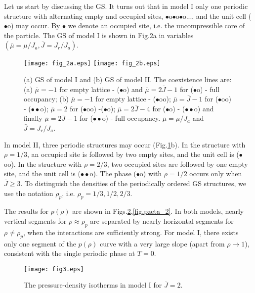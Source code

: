 \documentclass[preprint,
prl,%
aps]{revtex4}
\begin{document}
 Let us start by discussing the GS. 
It turns out that in model I only one periodic structure with  alternating empty and occupied sites,
$\bullet$o$\bullet$o$\bullet$o..., and the unit cell ($\bullet$o)
may occur. By $\bullet$ we denote an occupied site, i.e. the uncompressible core of the particle.
The GS of model I is shown in Fig.2a
in variables $(\bar\mu=\mu/J_a,\bar J=J_r/J_a)$. 
\begin{figure}[h]
\centering
\texttt{[image: fig\_2a.eps]}
\texttt{[image: fig\_2b.eps]}
\caption{ (a)  GS of  model I 
and (b) GS of model II. The coexistence lines are: (a) $\bar \mu=-1$ for
empty lattice - ($\bullet$o) and $\bar\mu=2\bar J -1$ for ($\bullet$o) - full occupancy;
 (b) $\bar\mu=-1$ for
empty  lattice  - ($\bullet$oo); $\bar\mu=\bar J-1$ for ($\bullet$oo) - ($\bullet\bullet$o); $\bar\mu=2$ for
($\bullet$oo) -($\bullet$o); $\bar\mu =2\bar J -4$  for ($\bullet$o) -  ($\bullet\bullet$o)
and finally  $\bar \mu= 2\bar J-1$ for ($\bullet\bullet$o) - full occupancy.
$\bar\mu=\mu/J_a$ and $\bar J=J_r/J_a$.
}
\label{fig.GS}
\end{figure}
%
In model II, three
periodic structures may occur  (Fig.\ref{fig.GS}b).
In the structure with  $\rho=1/3$, 
an occupied site is followed by two empty sites, 
and the unit cell is
($\bullet$oo). In the structure with $\rho=2/3$, two occupied
sites are followed by one empty site, 
and the unit cell is ($\bullet\bullet$o). 
The 
phase ($\bullet$o) with $\rho=1/2$
occurs only when $\bar J\ge 3$. 
To distinguish the  densities of the  periodically ordered GS structures, we use the notation $\rho_p$,
 i.e. $\rho_p=1/3,1/2,2/3$.
 
 
 The results for $p(\rho)$ are shown in  Figs.\ref{fig.pzeta_1},\ref{fig.pzeta_2}.
 In both models,  nearly vertical segments for $\rho\approx\rho_p$ are separated by 
 nearly horizontal segments for $\rho\ne \rho_p$, when the  interactions are sufficiently strong.
 For  model I, there exists only one segment of the $p(\rho)$ curve with a very large slope (apart from $\rho\to 1$),
 consistent with the single periodic phase at $T=0$. 
 
%
\begin{figure}[h]
\centering
\texttt{[image: fig3.eps]}
\caption{The pressure-density isotherms in model I for  $\bar J=2$. 
 }
\label{fig.pzeta_1}
\end{figure}
\end{document}
